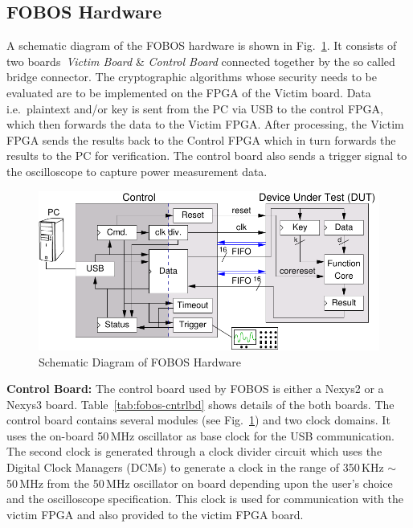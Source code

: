 \documentclass{llncs}
\numberwithin{algorithm}{chapter}
\begin{document}
\subsection{FOBOS Hardware}
A schematic diagram of the FOBOS 
hardware is shown in Fig.~\ref{fig:fobos-block}. It consists of
two boards~\textit{Victim Board} \& \textit{Control Board} connected together by 
the so called bridge connector.
The cryptographic algorithms whose security needs to be evaluated are to be implemented on 
the FPGA of the Victim board. Data i.e.\ plaintext and/or key is sent from the PC 
via USB to the control FPGA, which then forwards the data to the Victim FPGA. After 
processing, the Victim FPGA sends the results back to the Control FPGA which in turn 
forwards the results to the PC for verification. The control board also sends a 
trigger signal to the oscilloscope to capture power measurement data. 
%
\begin{figure}[t]
\begin{center}
\includegraphics[scale=0.8]{figures/fobos-block}
\caption{Schematic Diagram of FOBOS Hardware}\label{fig:fobos-block}
\end{center} 
\end{figure}
%


\textbf{Control Board:}
The control board used by FOBOS is either a Nexys2 or a Nexys3 board.  
Table~\ref{tab:fobos-cntrlbd} shows details of the both boards. 
The control board contains
several modules (see Fig.~\ref{fig:fobos-block}) and two clock domains.
It uses the on-board 50\,MHz oscillator as base clock for the USB communication.
The second clock is generated through a clock divider circuit which uses
the Digital Clock Managers (DCMs) to generate a clock in the range of 
350\,KHz $\sim$ 50\,MHz from the 50\,MHz oscillator on board depending upon the user's choice and the 
oscilloscope specification.  This clock is used for communication with the victim FPGA 
and also provided to the victim FPGA board.
\end{document}

